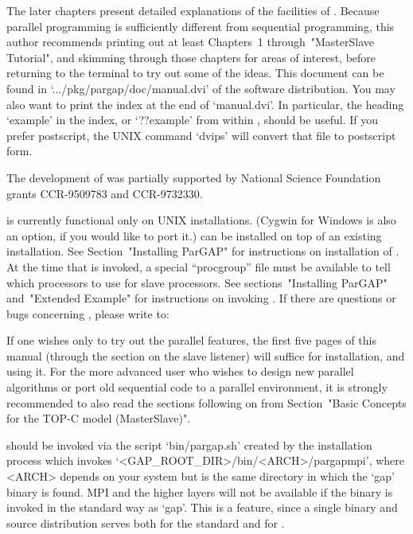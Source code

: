 \endlist

The later chapters present detailed explanations  of  the  facilities  of
{\ParGAP}. Because parallel programming is  sufficiently  different  from
sequential programming, this author  recommends  printing  out  at  least
Chapters~1 through~"MasterSlave Tutorial",  and  skimming  through  those
chapters for areas of interest, before returning to the terminal  to  try
out   some   of   the   ideas.   This   document   can   be   found    in
`.../pkg/pargap/doc/manual.dvi' of the  software  distribution.  You  may
also want to print the index at the end of `manual.dvi'.  In  particular,
the heading `example' in the index, or `??example'  from  within  {\GAP},
should be useful. If you prefer postscript, the UNIX command `dvips' will
convert that file to postscript form.

The development of {\ParGAP} was partially supported by National  Science
Foundation grants CCR-9509783 and CCR-9732330.


{\ParGAP} is currently functional only on UNIX installations. (Cygwin for
Windows is also an option, if you would like to port it.)  {\ParGAP}  can
be  installed  on  top  of   an   existing   {\GAP}   installation.   See
Section~"Installing  ParGAP"  for   instructions   on   installation   of
{\ParGAP}. At the time that {\ParGAP} is invoked, a special ``procgroup''
file must be available to tell {\ParGAP}  which  processors  to  use  for
slave processors. See sections~"Installing ParGAP" and~"Extended Example"
for instructions on invoking {\ParGAP}. If there are  questions  or  bugs
concerning {\ParGAP}, please write to: 

If one wishes only to try out the parallel features, the first five pages
of this manual (through the section on the slave listener)  will  suffice
for installation, and using it. For the more advanced user who wishes  to
design new parallel algorithms or port old sequential code to a  parallel
environment, it  is  strongly  recommended  to  also  read  the  sections
following  on  from  Section~"Basic  Concepts   for   the   TOP-C   model
(MasterSlave)".

{\ParGAP} should be invoked via the script `bin/pargap.sh' created by the
installation process which invokes `<GAP_ROOT_DIR>/bin/<ARCH>/pargapmpi',
where <ARCH> depends on your system but is the same  directory  in  which
the `gap' binary is  found.  MPI  and  the  higher  layers  will  not  be
available if the binary is invoked in the standard way as `gap'. This  is
a feature, since a single binary and source distribution serves both  for
the standard {\GAP} and for {\ParGAP}.

